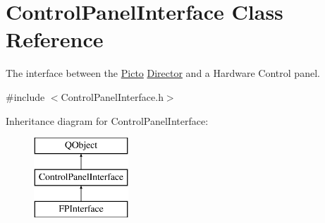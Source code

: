 \hypertarget{class_control_panel_interface}{\section{Control\-Panel\-Interface Class Reference}
\label{class_control_panel_interface}
}


The interface between the \hyperlink{namespace_picto}{Picto} \hyperlink{class_director}{Director} and a Hardware Control panel.  




{\ttfamily \#include $<$Control\-Panel\-Interface.\-h$>$}

Inheritance diagram for Control\-Panel\-Interface\-:\begin{figure}[H]
\begin{center}
\leavevmode
\includegraphics[height=3.000000cm]{class_control_panel_interface}
\end{center}
\end{figure}
